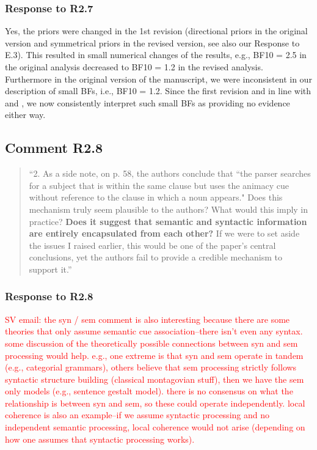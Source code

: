 \documentclass[12pt]{article}
\begin{document}
\subsubsection*{Response to R2.7}
Yes, the priors were changed in the 1st revision (directional priors in the original version and symmetrical priors in the revised version, see also our Response to E.3). This resulted in small numerical changes of the results, e.g., BF10 = 2.5 in the original analysis decreased to BF10 = 1.2 in the revised analysis. Furthermore in the original version of the manuscript, we were inconsistent in our description of small BFs, i.e., BF10 = 1.2. Since the first revision and in line with \cite{jeffreys1998theory} and \cite{lee2014bayesian}, we now consistently interpret such small BFs as providing no evidence either way.

 
\subsection*{Comment R2.8}
\begin{quote}
``2. As a side note, on p. 58, the authors conclude that ``the parser searches for a subject that is within the same clause but uses the animacy cue without reference to the clause in which a noun appears." Does this mechanism truly seem plausible to the authors? What would this imply in practice? \textbf{Does it suggest that semantic and syntactic information are entirely encapsulated from each other?} If we were to set aside the issues I raised earlier, this would be one of the paper's central conclusions, yet the authors fail to provide a credible mechanism to support it.''
\end{quote}
\subsubsection*{Response to R2.8}
\textcolor{red}{SV email: the syn / sem comment is also interesting because there are some theories that only assume semantic cue association--there isn't even any syntax. some discussion of the theoretically possible connections between syn and sem processing would help. e.g., one extreme is that syn and sem operate in tandem (e.g., categorial grammars), others believe that sem processing strictly follows syntactic structure building (classical montagovian stuff), then we have the sem only models (e.g., sentence gestalt model). there is no consensus on what the relationship is between syn and sem, so these could operate independently. local coherence is also an example--if we assume syntactic processing and no independent semantic processing, local coherence would not arise (depending on how one assumes that syntactic processing works).}
 
\end{document}
